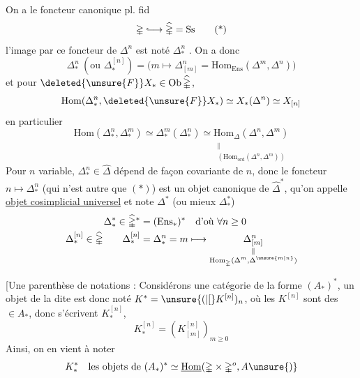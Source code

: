 On a le foncteur canonique pl. fid
\[
 \mathbb{\Delta}\lhook\joinrel\longrightarrow\widehat{\mathbb{\Delta}}=\mathrm{Ss}\tag*{(*)}
\]
l'image par ce foncteur de $\Delta^n$ est noté $\Delta^n_*$ . On a donc
\[
 \Delta^n_*\ (\text{ou }\Delta^{[n]}_*)=
 \bigl(m\longmapsto\Delta^n_{[m]}=\mathrm{Hom}_{\mathrm{Ens}}(\Delta^m,\Delta^n)\bigr)
\]
et pour $\deleted{\unsure{F}}X_*\in\mathrm{Ob}\,\widehat{\mathbb{\Delta}}$,
\[
 \mathrm{Hom}(\Delta^n_*,\deleted{\unsure{F}}X_*)\simeq X_*(\Delta^n)\simeq X_{[n]}
\]
en particulier
\[
 \mathrm{Hom}(\Delta^n_*,\Delta^m_*)\simeq\Delta^m_*(\Delta^n_*)\simeq
 \underset{\substack{\Vert\\(\mathrm{Hom}_{\mathrm{ord}}(\Delta^n,\Delta^m))}}{\mathrm{Hom}_{\mathbb{\Delta}}(\Delta^n,\Delta^m)}
\]
Pour $n$ variable, $\Delta^n_*\in\widehat{\mathbb{\Delta}}$ dépend de façon covariante de $n$,  donc le foncteur $n\longmapsto\Delta^n_*$ (qui n'est autre que $(*)$) est un objet canonique de $\widehat{\mathbb{\Delta}}^*$, qu'on appelle \uline{objet cosimplicial universel} et note $\Delta^*$ (ou mieux $\Delta^*_* $)
\[
 \begin{aligned}
 \Delta^*_*\in\widehat{\mathbb{\Delta}}^* &=(\mathrm{Ens}_*)^*
 \quad\text{d'où }\forall n\geq0\\
 \Delta^{[n]}_*\in\widehat{\mathbb{\Delta}} \qquad
 \Delta^{[n]}_*&=\Delta^n_* =m\longmapsto
 \underset{\substack{\Vert\\\mathrm{Hom}_{\mathbb{\Delta}}(\Delta^m,\Delta^{\unsure{m|n}})}}{\Delta^n_{[m]}}
 \end{aligned}
\]

 [Une parenthèse de notations : Considérons une catégorie de la forme $(A_*)^*$, un objet de la dite est donc noté $K^*=\unsure{(|[}K^{[n]})_n$, où les $K^{[n]}$ sont des $\in A_*$, donc s'écrivent $K^{[n]}_*$,
\[
 K^{[n]}_*=(K^{[n]}_{[m]})_{m\geq0}
\]
Ainsi, on en vient à noter
\[
 K^*_*\quad\text{les objets de }(A_*)^*\simeq
 \underline{\mathrm{Hom}}(\mathbb{\Delta}\times\mathbb{\Delta}^o,A\unsure{)}
\]
